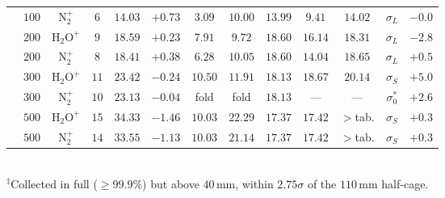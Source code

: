 \documentclass[hyperref]{cernrep}
\begin{document}
\begin{table}[htbp]
{\begin{tabular}{llccccccccccc}
 & $100$ & $\mathrm{N}_2^+$ & $6$ & $14.03$ & $+0.73$ & $3.09$ & $10.00$ & $13.99$ & $9.41$ & $14.02$ & $\sigma_L$ & $-0.0$ \\
 & $200$ & $\mathrm{H}_2\mathrm{O}^+$ & $9$ & $18.59$ & $+0.23$ & $7.91$ & $9.72$ & $18.60$ & $16.14$ & $18.31$ & $\sigma_L$ & $-2.8$ \\
 & $200$ & $\mathrm{N}_2^+$ & $8$ & $18.41$ & $+0.38$ & $6.28$ & $10.05$ & $18.60$ & $14.04$ & $18.65$ & $\sigma_L$ & $+0.5$ \\
 & $300$ & $\mathrm{H}_2\mathrm{O}^+$ & $11$ & $23.42$ & $-0.24$ & $10.50$ & $11.91$ & $18.13$ & $18.67$ & $20.14$ & $\sigma_S$ & $+5.0$ \\
 & $300$ & $\mathrm{N}_2^+$ & $10$ & $23.13$ & $-0.04$ & fold & fold & $18.13$ & --- & --- & $\sigma_0^*$ & $+2.6$ \\
 & $500$ & $\mathrm{H}_2\mathrm{O}^+$ & $15$ & $34.33$ & $-1.46$ & $10.03$ & $22.29$ & $17.37$ & $17.42$ & $>$tab. & $\sigma_S$ & $+0.3$ \\
 & $500$ & $\mathrm{N}_2^+$ & $14$ & $33.55$ & $-1.13$ & $10.03$ & $21.14$ & $17.37$ & $17.42$ & $>$tab. & $\sigma_S$ & $+0.3$ \\
\hline\hline
\end{tabular}
}
\\[2pt]
{\footnotesize $^\ddagger$Collected in full ($\ge 99.9\%$) but above
$40\,\mathrm{mm}$, within $2.75\sigma$ of the $110\,\mathrm{mm}$
half-cage.}
\end{table}
\end{document}
